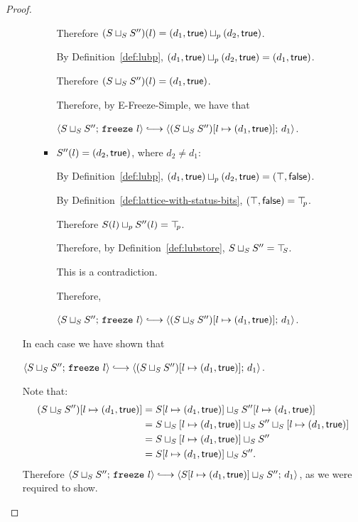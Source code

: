 \begin{proof}
\begin{itemize}
\begin{itemize}
\begin{itemize}
          Therefore $(S \sqcup_{S} S'')(l) =
          (d_1, \textsf{true}) \sqcup_p (d_2, \textsf{true})$.

          By Definition~\ref{def:lubp},
          $(d_1, \textsf{true}) \sqcup_p (d_2, \textsf{true}) =
          (d_1, \textsf{true})$.

          Therefore $(S \sqcup_{S} S'')(l) =
          (d_1, \textsf{true})$.

          Therefore, by {\sc E-Freeze-Simple}, we have that

          $\config{\lubstore{S}{S''}}{\freeze{l}}
          \parstepsto
          \config{\extS{(\lubstore{S}{S''})}{l}{d_1}{\frozentrue}}{d_1}$.

        \item $S''(l) = (d_2, \textsf{true})$, where $d_2 \neq d_1$:

          By Definition~\ref{def:lubp},
          $(d_1, \textsf{true}) \sqcup_p (d_2, \textsf{true})
          = (\top, \textsf{false})$.

          By Definition~\ref{def:lattice-with-status-bits},
          $(\top, \textsf{false}) = \top\hspace{-0.85mm}_{p}$.

          Therefore $S(l) \sqcup_p S''(l) = \top\hspace{-0.85mm}_{p}$.

          Therefore, by Definition~\ref{def:lubstore},
          $S \sqcup_{S} S'' = \top\hspace{-0.85mm}_{S}$.

          This is a contradiction.

          Therefore,

          $\config{\lubstore{S}{S''}}{\freeze{l}}
          \parstepsto
          \config{\extS{(\lubstore{S}{S''})}{l}{d_1}{\frozentrue}}{d_1}$.
        \end{itemize}
      \end{itemize}

      In each case we have shown that

      $\config{\lubstore{S}{S''}}{\freeze{l}} \parstepsto
      \config{\extS{(\lubstore{S}{S''})}{l}{d_1}{\frozentrue}}{d_1}$.

      Note that:
      \begin{align*}
        (S \sqcup_{S} S'')[l \mapsto (d_1, \textsf{true})] &=
        S[l \mapsto (d_1, \textsf{true})] \sqcup_{S} S''[l \mapsto (d_1, \textsf{true})] \\
        &= S \sqcup_{S} \left[ l \mapsto (d_1, \textsf{true}) \right] \sqcup_{S} S'' \sqcup_{S} \left[ l \mapsto (d_1, \textsf{true}) \right] \\
        &= S \sqcup_{S} \left[ l \mapsto (d_1, \textsf{true}) \right] \sqcup_{S} S'' \\
        &= S[l \mapsto (d_1, \textsf{true})] \sqcup_{S} S''.
      \end{align*}
      Therefore
      $\config{\lubstore{S}{S''}}{\freeze{l}}
      \parstepsto
      \config{\lubstore{\extS{S}{l}{d_1}{\frozentrue}}{S''}}{d_1}$,
      as we were required to show.
  \end{itemize}
\end{proof}
